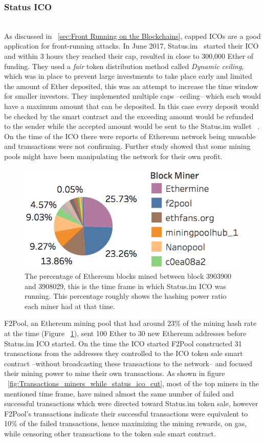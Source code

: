 \subsubsection{Status ICO} \hfill\\ 
\noindent As discussed in ~\ref{sec:Front Running on the Blockchains}, capped ICOs are a good application for front-running attacks.  In June 2017, Status.im~\cite{statuswhitepaper} started their ICO and within 3 hours they reached their cap, resulted in close to 300,000 Ether of funding. They used a \textit{fair} token distribution method called \textit{Dynamic ceiling}, which was in place to prevent large investments to take place early and limited the amount of Ether deposited, this was an attempt to increase the time window for smaller investors. They implemented multiple caps --ceiling-- which each would have a maximum amount that can be deposited. In this case every deposit would be checked by the smart contract and the exceeding amount would be refunded to the sender while the accepted amount would be sent to the Status.im wallet ~\cite{statusicoanalysis}. 
On the time of the ICO there were reports of Ethereum network being unusable and transactions were not confirming. Further study showed that some mining pools might have been manipulating the network for their own profit.

\begin{figure}[h]
\centering
\includegraphics[width=0.5\linewidth]{figures/Mining_pool_ratio.png}
\caption{The percentage of Ethereum blocks mined between block 3903900 and 3908029, this is the time frame in which Status.im ICO was running. This percentage roughly shows the hashing power ratio each miner had at that time. \label{fig:mining_pool_ratio}} %
\end{figure}

F2Pool, an Ethereum mining pool that had around 23\% of the mining hash rate at the time (Figure ~\ref{fig:mining_pool_ratio}), sent 100 Ether to 30 new Ethereum addresses before Status.im ICO started. On the time the ICO started F2Pool constructed 31 transactions from the addresses they controlled to the ICO token sale smart contract --without broadcasting these transactions to the network-- and focused their mining power to mine their own transactions.
As shown in figure  ~\ref{fig:Transactions_miners_while_status_ico_cut}, most of the top miners in the mentioned time frame, have mined almost the same number of failed and successful transactions which were directed toward Status.im token sale, however F2Pool's transactions indicate their successful transactions were equivalent to 10\% of the failed transactions, hence maximizing the mining rewards, on gas, while censoring other transactions to the token sale smart contract.


